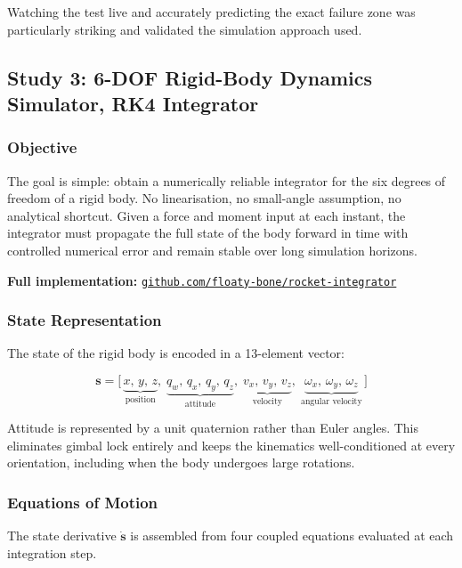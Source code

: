 \documentclass[11pt,a4paper]{article}
\begin{document}
Watching the test live and accurately predicting the exact failure zone was particularly striking and validated the simulation approach used.


\newpage

\subsection{Study 3: 6-DOF Rigid-Body Dynamics Simulator, RK4 Integrator}

\subsubsection{Objective}

The goal is simple: obtain a numerically reliable integrator for the six degrees of freedom of a rigid body. No linearisation, no small-angle assumption, no analytical shortcut. Given a force and moment input at each instant, the integrator must propagate the full state of the body forward in time with controlled numerical error and remain stable over long simulation horizons.

\medskip
\noindent\textbf{Full implementation:} \href{https://github.com/floaty-bone/rocket-integrator}{\texttt{github.com/floaty-bone/rocket-integrator}}

\subsubsection{State Representation}

The state of the rigid body is encoded in a 13-element vector:

\[
\mathbf{s} = \bigl[\,\underbrace{x,\,y,\,z}_{\text{position}},\;\underbrace{q_w,\,q_x,\,q_y,\,q_z}_{\text{attitude}},\;\underbrace{v_x,\,v_y,\,v_z}_{\text{velocity}},\;\underbrace{\omega_x,\,\omega_y,\,\omega_z}_{\text{angular velocity}}\,\bigr]
\]

Attitude is represented by a unit quaternion rather than Euler angles. This eliminates gimbal lock entirely and keeps the kinematics well-conditioned at every orientation, including when the body undergoes large rotations.

\subsubsection{Equations of Motion}

The state derivative $\dot{\mathbf{s}}$ is assembled from four coupled equations evaluated at each integration step.
\end{document}
